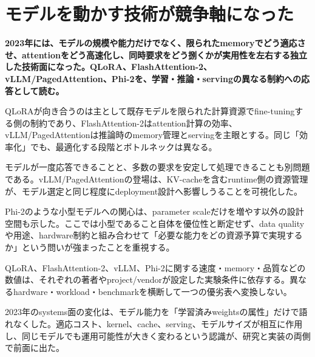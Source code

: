 \section{モデルを動かす技術が競争軸になった}
\noindent\textbf{2023年には、モデルの規模や能力だけでなく、限られたmemoryでどう適応させ、attentionをどう高速化し、同時要求をどう捌くかが実用性を左右する独立した技術面になった。QLoRA、FlashAttention-2、vLLM/PagedAttention、Phi-2を、学習・推論・servingの異なる制約への応答として読む。}\autocite{src-1ab9d44a819a,src-5e1a3a4fc45b,src-6e61359d2fae,src-7f830e688335,src-e03b0ba5b24e,src-fb804ac849e4}

QLoRAが向き合うのは主として既存モデルを限られた計算資源でfine-tuningする側の制約であり、FlashAttention-2はattention計算の効率、vLLM/PagedAttentionは推論時のmemory管理とservingを主眼とする。同じ「効率化」でも、最適化する段階とボトルネックは異なる。\autocite{src-1ab9d44a819a,src-5e1a3a4fc45b,src-7f830e688335,src-e03b0ba5b24e,src-fb804ac849e4}


モデルが一度応答できることと、多数の要求を安定して処理できることも別問題である。vLLM/PagedAttentionの登場は、KV-cacheを含むruntime側の資源管理が、モデル選定と同じ程度にdeployment設計へ影響しうることを可視化した。\autocite{src-1ab9d44a819a,src-e03b0ba5b24e,src-fb804ac849e4}


Phi-2のような小型モデルへの関心は、parameter scaleだけを増やす以外の設計空間も示した。ここでは小型であること自体を優位性と断定せず、data qualityや用途、hardware制約と組み合わせて「必要な能力をどの資源予算で実現するか」という問いが強まったことを重視する。\autocite{src-6e61359d2fae}


\begin{claimboundary}
QLoRA、FlashAttention-2、vLLM、Phi-2に関する速度・memory・品質などの数値は、それぞれの著者やproject/vendorが設定した実験条件に依存する。異なるhardware・workload・benchmarkを横断して一つの優劣表へ変換しない。\autocite{src-1ab9d44a819a,src-5e1a3a4fc45b,src-6e61359d2fae,src-7f830e688335,src-e03b0ba5b24e,src-fb804ac849e4}
\end{claimboundary}

2023年のsystems面の変化は、モデル能力を「学習済みweightsの属性」だけで語れなくした。適応コスト、kernel、cache、serving、モデルサイズが相互に作用し、同じモデルでも運用可能性が大きく変わるという認識が、研究と実装の両側で前面に出た。\autocite{src-1ab9d44a819a,src-5e1a3a4fc45b,src-6e61359d2fae,src-7f830e688335,src-e03b0ba5b24e,src-fb804ac849e4}

